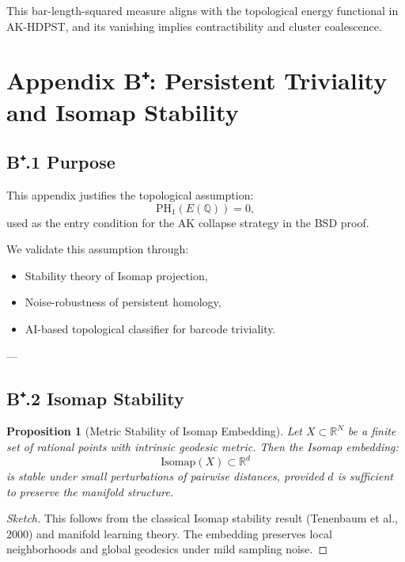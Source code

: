 \documentclass[11pt]{article}
\newtheorem{proposition}[theorem]{Proposition}
\theoremstyle{definition}
\begin{document}
This bar-length-squared measure aligns with the topological energy functional in AK-HDPST, and its vanishing implies contractibility and cluster coalescence.



\section*{Appendix B⁺: Persistent Triviality and Isomap Stability}

\subsection*{B⁺.1 Purpose}

This appendix justifies the topological assumption:
\[
\mathrm{PH}_1(E(\mathbb{Q})) = 0,
\]
used as the entry condition for the AK collapse strategy in the BSD proof.

We validate this assumption through:
\begin{itemize}
  \item Stability theory of Isomap projection,
  \item Noise-robustness of persistent homology,
  \item AI-based topological classifier for barcode triviality.
\end{itemize}

---

\subsection*{B⁺.2 Isomap Stability}

\begin{proposition}[Metric Stability of Isomap Embedding]
Let \( X \subset \mathbb{R}^N \) be a finite set of rational points with intrinsic geodesic metric.  
Then the Isomap embedding:
\[
\mathrm{Isomap}(X) \subset \mathbb{R}^d
\]
is stable under small perturbations of pairwise distances, provided \( d \) is sufficient to preserve the manifold structure.
\end{proposition}

\begin{proof}[Sketch]
This follows from the classical Isomap stability result (Tenenbaum et al., 2000) and manifold learning theory.  
The embedding preserves local neighborhoods and global geodesics under mild sampling noise.
\end{proof}
\end{document}
